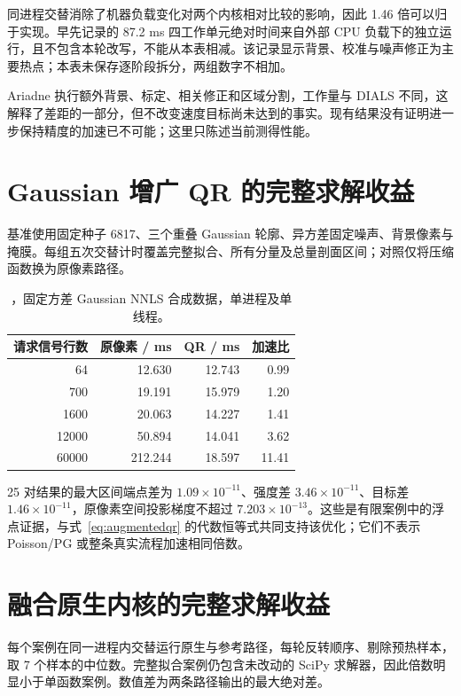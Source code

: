同进程交替消除了机器负载变化对两个内核相对比较的影响，因此 1.46 倍可以归于实现。早先记录的 87.2 ms 四工作单元绝对时间来自外部 CPU 负载下的独立运行，且不包含本轮改写，不能从本表相减。该记录显示背景、校准与噪声修正为主要热点；本表未保存逐阶段拆分，两组数字不相加。

Ariadne 执行额外背景、标定、相关修正和区域分割，工作量与 DIALS 不同，这解释了差距的一部分，但不改变速度目标尚未达到的事实。现有结果没有证明进一步保持精度的加速已不可能；这里只陈述当前测得性能。
\section{Gaussian 增广 QR 的完整求解收益}
基准使用固定种子 6817、三个重叠 Gaussian 轮廓、异方差固定噪声、背景像素与掩膜。每组五次交替计时覆盖完整拟合、所有分量及总量剖面区间；对照仅将压缩函数换为原像素路径。
\begin{table}[htbp]\centering\small
\begin{tabular}{rrrr}
\toprule 请求信号行数 & 原像素 / ms & QR / ms & 加速比\\\midrule
64 & 12.630 & 12.743 & 0.99\\
700 & 19.191 & 15.979 & 1.20\\
1600 & 20.063 & 14.227 & 1.41\\
12000 & 50.894 & 14.041 & 3.62\\
60000 & 212.244 & 18.597 & 11.41\\
\bottomrule
\end{tabular}
\caption{，固定方差 Gaussian NNLS 合成数据，单进程及单线程。}
\end{table}
25 对结果的最大区间端点差为 $1.09\times10^{-11}$、强度差 $3.46\times10^{-11}$、目标差 $1.46\times10^{-11}$，原像素空间投影梯度不超过 $7.203\times10^{-13}$。这些是有限案例中的浮点证据，与式~\eqref{eq:augmentedqr} 的代数恒等式共同支持该优化；它们不表示 Poisson/PG 或整条真实流程加速相同倍数。
\section{融合原生内核的完整求解收益}
每个案例在同一进程内交替运行原生与参考路径，每轮反转顺序、剔除预热样本，取 7 个样本的中位数。完整拟合案例仍包含未改动的 SciPy 求解器，因此倍数明显小于单函数案例。数值差为两条路径输出的最大绝对差。

